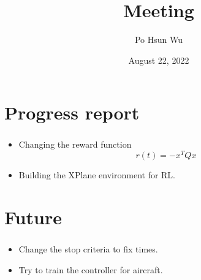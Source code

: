 \documentclass{beamer}
\date{August 22, 2022}
\title{Meeting}
\author{Po Hsun Wu}
\begin{document}
    \maketitle

    \section{Progress report}
    \begin{frame}
        \frametitle{\secname}

        \begin{itemize}
            \item Changing the reward function
            $$r(t) = -x^TQx$$
            \item Building the XPlane environment for RL.
        \end{itemize}
    \end{frame}

    \section{Future}
    \begin{frame}
        \frametitle{\secname}

        \begin{itemize}
            \item Change the stop criteria to fix times.
            \item Try to train the controller for aircraft.
        \end{itemize}

    \end{frame}
\end{document}
